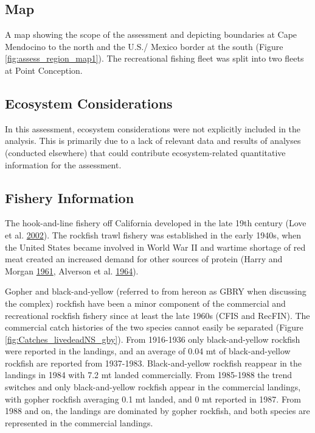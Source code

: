 \documentclass[12pt,]{article}
\begin{document}
\subsection{Map}\label{map}

A map showing the scope of the assessment and depicting boundaries at
Cape Mendocino to the north and the U.S./ Mexico border at the south
(Figure \ref{fig:assess_region_map1}). The recreational fishing fleet
was split into two fleets at Point Conception.

\subsection{Ecosystem Considerations}\label{ecosystem-considerations-1}

In this assessment, ecosystem considerations were not explicitly
included in the analysis. This is primarily due to a lack of relevant
data and results of analyses (conducted elsewhere) that could contribute
ecosystem-related quantitative information for the assessment.

\subsection{Fishery Information}\label{fishery-information}

The hook-and-line fishery off California developed in the late 19th
century (Love et al. \protect\hyperlink{ref-Love2002}{2002}). The
rockfish trawl fishery was established in the early 1940s, when the
United States became involved in World War II and wartime shortage of
red meat created an increased demand for other sources of protein (Harry
and Morgan \protect\hyperlink{ref-Harry1961}{1961}, Alverson et al.
\protect\hyperlink{ref-Alverson1964}{1964}).

Gopher and black-and-yellow (referred to from hereon as GBRY when
discussing the complex) rockfish have been a minor component of the
commercial and recreational rockfish fishery since at least the late
1960s (CFIS and RecFIN). The commercial catch histories of the two
species cannot easily be separated (Figure
\ref{fig:Catches_livedeadNS_gby}). From 1916-1936 only black-and-yellow
rockfish were reported in the landings, and an average of 0.04 mt of
black-and-yellow rockfish are reported from 1937-1983. Black-and-yellow
rockfish reappear in the landings in 1984 with 7.2 mt landed
commercially. From 1985-1988 the trend switches and only
black-and-yellow rockfish appear in the commercial landings, with gopher
rockfish averaging 0.1 mt landed, and 0 mt reported in 1987. From 1988
and on, the landings are dominated by gopher rockfish, and both species
are represented in the commercial landings.
\end{document}
